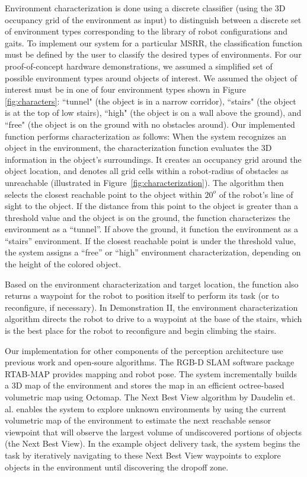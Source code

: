\documentclass[12pt]{article}
\begin{document}
Environment characterization is done using a discrete classifier (using the 3D occupancy grid of the environment as input) to distinguish between a discrete set of environment types corresponding to the library of robot configurations and gaits. To implement our system for a particular MSRR, the classification function must be defined by the user to classify the desired types of environments. For our proof-of-concept hardware demonstrations, we assumed a simplified set of possible environment types around objects of interest. We assumed the object of interest must be in one of four environment types shown in Figure \ref{fig:characters}: ``tunnel" (the object is in a narrow corridor), ``stairs" (the object is at the top of low stairs), ``high" (the object is on a wall above the ground), and ``free" (the object is on the ground with no obstacles around). Our implemented function performs characterization as follows: When the system recognizes an object in the environment, the characterization function evaluates the 3D information in the object's surroundings. It creates an occupancy grid around the object location, and denotes all grid cells within a robot-radius of obstacles as unreachable (illustrated in Figure~\ref{fig:characterization}). The algorithm then selects the closest reachable point to the object within $20^o$ of the robot's line of sight to the object. If the distance from this point to the object is greater than a threshold value and the object is on the ground, the function characterizes the environment as a ``tunnel''. If above the ground, it function the environment as a ``stairs'' environment. If the closest reachable point is under the threshold value, the system assigns a ``free'' or ``high'' environment characterization, depending on the height of the colored object.

Based on the environment characterization and target location, the function also returns a waypoint for the robot to position itself to perform its task (or to reconfigure, if necessary).  In Demonstration II, the environment characterization algorithm directs the robot to drive to a waypoint at the base of the stairs, which is the best place for the robot to reconfigure and begin climbing the stairs.

Our implementation for other components of the perception architecture use previous work and open-soure algorithms. The RGB-D SLAM software package RTAB-MAP\cite{rtabmap} provides mapping and robot pose. The system incrementally builds a 3D map of the environment and stores the map in an efficient octree-based volumetric map using Octomap\cite{octomap}. The Next Best View algorithm by Daudelin et. al.\cite{Daudelin2017} enables the system to explore unknown environments by using the current volumetric map of the environment to estimate the next reachable sensor viewpoint that will observe the largest volume of undiscovered portions of objects (the Next Best View). In the example object delivery task, the system begins the task by iteratively navigating to these Next Best View waypoints to explore objects in the environment until discovering the dropoff zone.
\end{document}
